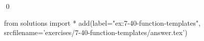 
\begin{ex}
  \label{ex:7-40-function-templates}
  
  \qed
\end{ex}
\begin{python0}
from solutions import *
add(label="ex:7-40-function-templates",
    srcfilename='exercises/7-40-function-templates/answer.tex')
\end{python0}
